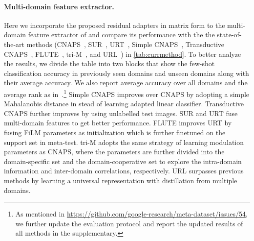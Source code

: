 \paragraph{Multi-domain feature extractor.}
Here we incorporate the proposed residual adapters in matrix form to the multi-domain feature extractor of \cite{li2021universal} and compare its performance with the the state-of-the-art methods  (CNAPS~\cite{requeima2019fast}, SUR~\cite{dvornik2020selecting}, URT~\cite{liu2020universal}, Simple CNAPS~\cite{bateni2020improved}, Transductive CNAPS~\cite{bateni2020enhancing}, FLUTE~\cite{triantafillou2021flute}, tri-M~\cite{liu2021multi}, and URL~\cite{li2021universal}) in \cref{tab:currmethod}. 
To better analyze the results, we divide the table into two blocks that show the few-shot classification accuracy in previously seen domains and unseen domains along with their average accuracy.
We also report average accuracy over all domains and the average rank as in~\cite{triantafillou2021flute,li2021universal}.\footnote{As mentioned in \url{https://github.com/google-research/meta-dataset/issues/54}, we further update the evaluation protocol and report the updated results of all methods in the supplementary.}
Simple CNAPS improves over CNAPS by adopting a simple Mahalanobis distance in stead of learning adapted linear classifier. Transductive CNAPS further improves by using unlabelled test images. SUR and URT fuse multi-domain features to get better performance. FLUTE improves URT by fusing FiLM parameters as initialization which is further finetuned on the support set in meta-test.
tri-M adopts the same strategy of learning modulation parameters as CNAPS, where the parameters are further divided into the domain-specific set and the domain-cooperative set to explore the intra-domain information and inter-domain correlations, respectively.
URL surpasses previous methods by learning a universal representation with distillation from multiple domains.


